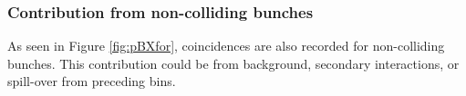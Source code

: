 \subsubsection{Contribution from non-colliding bunches}
As seen in Figure \ref{fig:pBXfor}, coincidences are also recorded for non-colliding bunches. This contribution could be from background, secondary interactions, or spill-over from preceding bins. 





%
%


